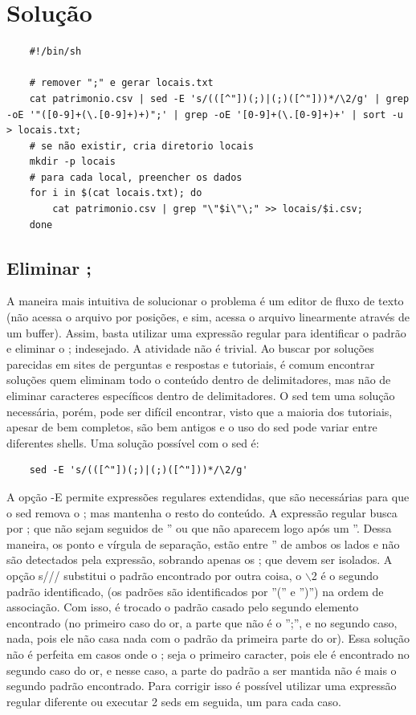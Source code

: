 \documentclass[oneside, 11 pt]{article}
\begin{document}
	\pagebreak
	
	\section{Solução}
	\begin{lstlisting}
	#!/bin/sh
	
	# remover ";" e gerar locais.txt
	cat patrimonio.csv | sed -E 's/(([^"])(;)|(;)([^"]))*/\2/g' | grep -oE '"([0-9]+(\.[0-9]+)+)";' | grep -oE '[0-9]+(\.[0-9]+)+' | sort -u > locais.txt;
	# se não existir, cria diretorio locais
	mkdir -p locais
	# para cada local, preencher os dados
	for i in $(cat locais.txt); do
		cat patrimonio.csv | grep "\"$i\"\;" >> locais/$i.csv;
	done
	\end{lstlisting}
	\subsection{Eliminar ;}
	A maneira mais intuitiva de solucionar o problema é um editor de fluxo de texto (não acessa o arquivo por posições, e sim, acessa o arquivo linearmente através de um buffer). Assim, basta utilizar uma expressão regular \cite{regex} para identificar o padrão e eliminar o ; indesejado. A atividade não é trivial. Ao buscar por soluções parecidas em sites de perguntas e respostas e tutoriais, é comum encontrar soluções quem eliminam todo o conteúdo dentro de delimitadores, mas não de eliminar caracteres específicos dentro de delimitadores. O sed tem uma solução necessária, porém, pode ser difícil encontrar, visto que a maioria dos tutoriais, apesar de bem completos, são bem antigos e o uso do sed pode variar entre diferentes shells. Uma solução possível com o sed é:
	\begin{lstlisting}
	sed -E 's/(([^"])(;)|(;)([^"]))*/\2/g'
	\end{lstlisting}
	A opção -E permite expressões regulares extendidas, que são necessárias para que o sed remova o ; mas mantenha o resto do conteúdo. A expressão regular busca por ; que não sejam seguidos de '' ou que não aparecem logo após um ''. Dessa maneira, os ponto e vírgula de separação, estão entre '' de ambos os lados e não são detectados pela expressão, sobrando apenas os ; que devem ser isolados. A opção s/// substitui o padrão encontrado por outra coisa, o $\backslash$2 é o segundo padrão identificado, (os padrões são identificados por ''('' e '')'') na ordem de associação. Com isso, é trocado o padrão casado pelo segundo elemento encontrado (no primeiro caso do or, a parte que não é o '';'', e no segundo caso, nada, pois ele não casa nada com o padrão da primeira parte do or). Essa solução não é perfeita em casos onde o ; seja o primeiro caracter, pois ele é encontrado no segundo caso do or, e nesse caso, a parte do padrão a ser mantida não é mais o segundo padrão encontrado. Para corrigir isso é possível utilizar uma expressão regular diferente ou executar 2 seds em seguida, um para cada caso.
\end{document}
